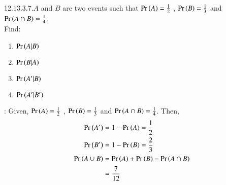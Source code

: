 \documentclass[journal,12pt,twocolumn]{IEEEtran}
\theoremstyle{remark}
\begin{document}
\renewcommand{\thefigure}{\theenumi}
\renewcommand{\thetable}{\theenumi}
12.13.3.7.$A$ and $B$ are two events such that $\Pr\left(A\right)= \frac{1}{2}$ , $\Pr\left(B\right)= \frac{1}{3}$ and $\Pr\left(A \cap B\right)= \frac{1}{4}$.\\
Find:
\begin{enumerate}[label =\roman*]
\item $\Pr\left(A|B\right)$  \item $\Pr\left(B|A\right)$  \item $\Pr\left(A'|B\right)$  \item $\Pr\left(A'|B'\right)$
\end{enumerate}
\solution:
Given, $\Pr\left(A\right)= \frac{1}{2}$ , $\Pr\left(B\right)= \frac{1}{3}$ and $\Pr\left(A \cap B\right)= \frac{1}{4}$. Then,\\
\begin{equation}
\label{eq:12.13.3.7}
\begin{split}
\pr{A'}&= 1-\pr{A} = \frac{1}{2}\\
\pr{B'}&= 1-\pr{B} = \frac{2}{3}\\
\pr{A \cup B}&= \pr{A} +\pr{B} -\pr{A \cap B}\\
&= \frac{7}{12}
\end{split}
\end{equation}
\end{document}
